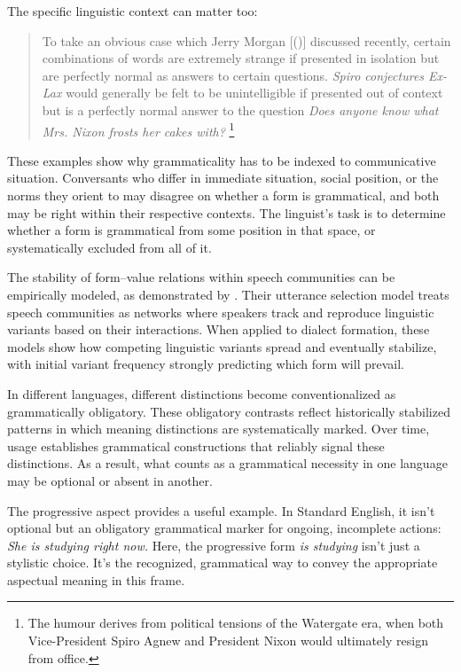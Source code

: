 \documentclass[12pt,letterpaper]{article}
\newcommand{\mention}[1]{\textit{#1}}
\begin{document}
The specific linguistic context can matter too:
\begin{quote}
To take an obvious case which Jerry Morgan [(\citeyear{morgan1973})] discussed recently, certain combinations of words are extremely strange if presented in isolation but are perfectly normal as answers to certain questions. \textit{Spiro conjectures Ex-Lax} would generally be felt to be unintelligible if presented out of context but is a perfectly normal answer to the question \textit{Does anyone know what Mrs. Nixon frosts her cakes with?} \autocite[252, italics added]{McCawley1974}\footnote{The humour derives from political tensions of the Watergate era, when both Vice-President Spiro Agnew and President Nixon would ultimately resign from office.}
\end{quote}

These examples show why grammaticality has to be indexed to communicative situation. Conversants who differ in immediate situation, social position, or the norms they orient to may disagree on whether a form is grammatical, and both may be right within their respective contexts. The linguist's task is to determine whether a form is grammatical from some position in that space, or systematically excluded from all of it.

The stability of form--value relations within speech communities can be empirically modeled, as demonstrated by \textcite{blythe2009speech}. Their utterance selection model treats speech communities as networks where speakers track and reproduce linguistic variants based on their interactions. When applied to dialect formation, these models show how competing linguistic variants spread and eventually stabilize, with initial variant frequency strongly predicting which form will prevail.

\label{sec:community-values}%
In different languages, different distinctions become conventionalized as grammatically obligatory. These obligatory contrasts reflect historically stabilized patterns in which meaning distinctions are systematically marked. Over time, usage establishes grammatical constructions that reliably signal these distinctions. As a result, what counts as a grammatical necessity in one language may be optional or absent in another.

The progressive aspect provides a useful example. In Standard English, it isn't optional but an obligatory grammatical marker for ongoing, incomplete actions:
\ea
\mention{She is studying right now.}
\z
Here, the progressive form \mention{is studying} isn't just a stylistic choice. It's the recognized, grammatical way to convey the appropriate aspectual meaning in this frame.
\end{document}
